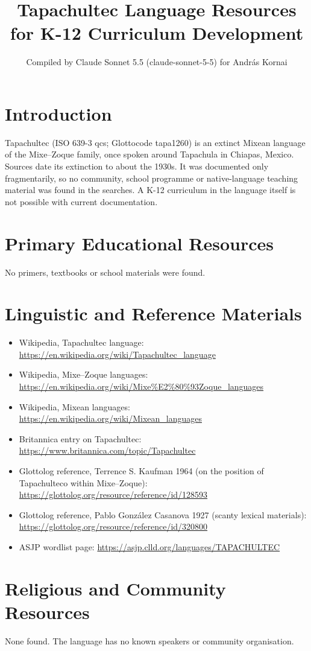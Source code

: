 \documentclass[12pt]{article}
\title{Tapachultec Language Resources for K-12 Curriculum Development}
\author{Compiled by Claude Sonnet 5.5 (claude-sonnet-5-5) for Andr\'as Kornai}
\date{}
\begin{document}
\maketitle

\section{Introduction}
Tapachultec (ISO 639-3 qcs; Glottocode tapa1260) is an extinct Mixean language of the Mixe--Zoque family, once spoken around Tapachula in Chiapas, Mexico. Sources date its extinction to about the 1930s. It was documented only fragmentarily, so no community, school programme or native-language teaching material was found in the searches. A K-12 curriculum in the language itself is not possible with current documentation.

\section{Primary Educational Resources}
No primers, textbooks or school materials were found.

\section{Linguistic and Reference Materials}
\begin{itemize}
\item Wikipedia, Tapachultec language: \url{https://en.wikipedia.org/wiki/Tapachultec_language}
\item Wikipedia, Mixe--Zoque languages: \url{https://en.wikipedia.org/wiki/Mixe%E2%80%93Zoque_languages}
\item Wikipedia, Mixean languages: \url{https://en.wikipedia.org/wiki/Mixean_languages}
\item Britannica entry on Tapachultec: \url{https://www.britannica.com/topic/Tapachultec}
\item Glottolog reference, Terrence S. Kaufman 1964 (on the position of Tapachulteco within Mixe--Zoque): \url{https://glottolog.org/resource/reference/id/128593}
\item Glottolog reference, Pablo Gonz\'alez Casanova 1927 (scanty lexical materials): \url{https://glottolog.org/resource/reference/id/320800}
\item ASJP wordlist page: \url{https://asjp.clld.org/languages/TAPACHULTEC}
\end{itemize}

\section{Religious and Community Resources}
None found. The language has no known speakers or community organisation.
\end{document}
